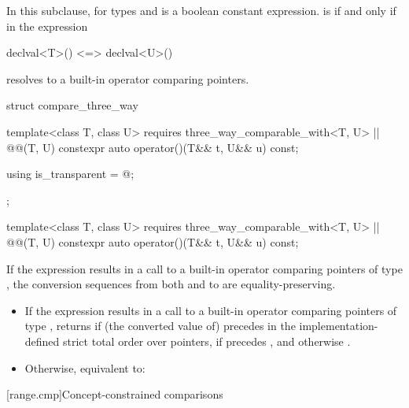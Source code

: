 \pnum
In this subclause, 
for types  and  is a boolean constant expression.
 is 
if and only if \tcode{<=>} in the expression
\begin{codeblock}
declval<T>() <=> declval<U>()
\end{codeblock}
resolves to a built-in operator comparing pointers.

%
\begin{codeblock}
struct compare_three_way {
  template<class T, class U>
    requires three_way_comparable_with<T, U> || @@(T, U)
  constexpr auto operator()(T&& t, U&& u) const;

  using is_transparent = @\unspec@;
};
\end{codeblock}

\begin{itemdecl}
template<class T, class U>
  requires three_way_comparable_with<T, U> || @@(T, U)
constexpr auto operator()(T&& t, U&& u) const;
\end{itemdecl}

\begin{itemdescr}
\pnum
\expects
If the expression  results in
a call to a built-in operator \tcode{<=>} comparing pointers of type ,
the conversion sequences from both  and  to 
are equality-preserving.

\pnum
\effects
\begin{itemize}
\item
  If the expression  results in
  a call to a built-in operator \tcode{<=>} comparing pointers of type ,
  returns 
  if (the converted value of)  precedes 
  in the implementation-defined strict total order
  over pointers,
  if  precedes , and
  otherwise .
\item
  Otherwise, equivalent to: 
\end{itemize}
\end{itemdescr}

[range.cmp]{Concept-constrained comparisons}

